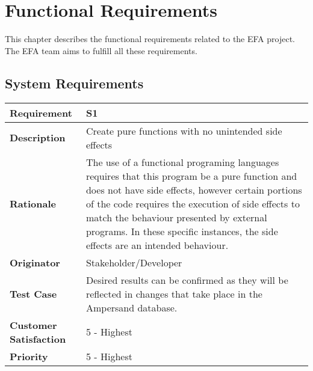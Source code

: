 \chapter{Functional Requirements}\label{sec:Functional}

 
This chapter describes the functional requirements related to the EFA project. The EFA team aims to fulfill all these requirements.

\section{System Requirements}
{\setlength{\tabcolsep}{6pt} %
    \begin{tabularx}{\textwidth}{>{\bfseries}m{3cm}X}
        Requirement & S1 \\ 
        \midrule
        \endhead
        Description  & Create pure functions with no unintended side effects
        \\	Rationale & The use of a functional programing languages requires 
        that this program be a pure function and does not have side effects, 
        however certain portions of the code requires the execution of side 
        effects to match the behaviour presented by external programs. In these 
        specific instances, the side effects are an intended behaviour.
        \\	Originator & Stakeholder/Developer
        
        \\ Test Case & Desired results can be confirmed as they will be 
        reflected in changes that take place in the Ampersand database.
        \\	Customer Satisfaction & 5 - Highest 
        \\	Priority & 5 - Highest 
        \vspace{12pt}
    \end{tabularx}
}


